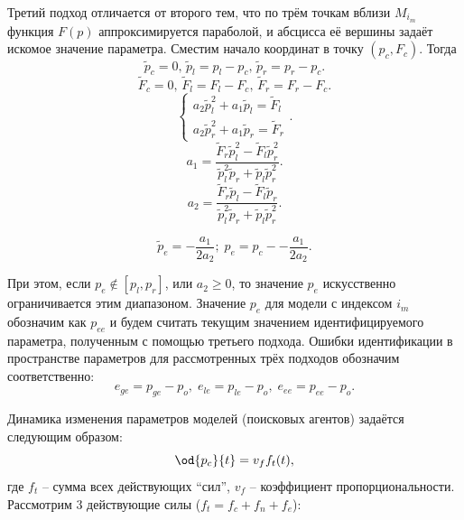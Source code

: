 \documentclass[a4paper,paratype,14pt,fouriernc]{dissatu}
\begin{document}
Третий подход отличается от второго тем, что по трём точкам вблизи  $M_{i_{m}}$
функция $F(p)$ аппроксимируется параболой, и абсцисса её вершины задаёт искомое
значение параметра. Сместим начало координат в точку
$ ( p_c, F_c ) $. Тогда
%
\[
  \tilde{p}_c = 0, \,
  \tilde{p}_l = p_l - p_c, \,
  \tilde{p}_r = p_r - p_c.
\]
%
\[
  \tilde{F}_c = 0, \,
  \tilde{F}_l = F_l - F_c, \,
  \tilde{F}_r = F_r - F_c.
\]
%
\[
  \left\{
    \begin{array}{l}
      a_2 \tilde{p}_l^2 + a_1 \tilde{p}_l  = \tilde{F}_l
      \\
      a_2 \tilde{p}_r^2 + a_1 \tilde{p}_r  = \tilde{F}_r
    \end{array}
  \right. .
\]
%
\[
  a_1 = \frac{\tilde{F}_r \tilde{p}_l^2 - \tilde{F}_l \tilde{p}_r^2 }
             { \tilde{p}_l^2 \tilde{p}_r  + \tilde{p}_l \tilde{p}_r^2 }.
\]
%
\[
  a_2 = \frac{\tilde{F}_r \tilde{p}_l - \tilde{F}_l \tilde{p}_r }
             { \tilde{p}_l^2 \tilde{p}_r  + \tilde{p}_l \tilde{p}_r^2 }.
\]

\begin{equation}
  \tilde{p}_e = - \frac{a_1}{2 a_2};
  \;
  p_e = p_c -- \frac{a_1}{2 a_2}.
  \label{atu:eq:p_e}
\end{equation}


При этом, если
$ p_e \notin [ p_l, p_r ] $, или $ a_2 \ge 0 $, то значение $p_e$ искусственно
ограничивается этим диапазоном. Значение $p_e$ для модели с индексом
$i_m$ обозначим как $p_{ee}$ и будем считать
текущим значением идентифицируемого параметра, полученным с помощью
третьего подхода. Ошибки идентификации в пространстве параметров
для рассмотренных трёх подходов обозначим соответственно:
%
\begin{equation}
  e_{ge} = p_{ge} - p_o, \;
  e_{le} = p_{le} - p_o, \;
  e_{ee} = p_{ee} - p_o.
  \label{atu:eq:e_xx}
\end{equation}


Динамика изменения параметров моделей (поисковых агентов) задаётся следующим образом:
%
\begin{equation}
  \od{p_c}{t} = v_f f_t(t),
  \label{atu:eq:dp_dt}
\end{equation}
%
\noindent
где $f_t$ -- сумма всех действующих ``сил'', $v_f$ -- коэффициент
пропорциональности. Рассмотрим 3 действующие силы
($ f_t = f_c + f_n + f_e $):
\end{document}
